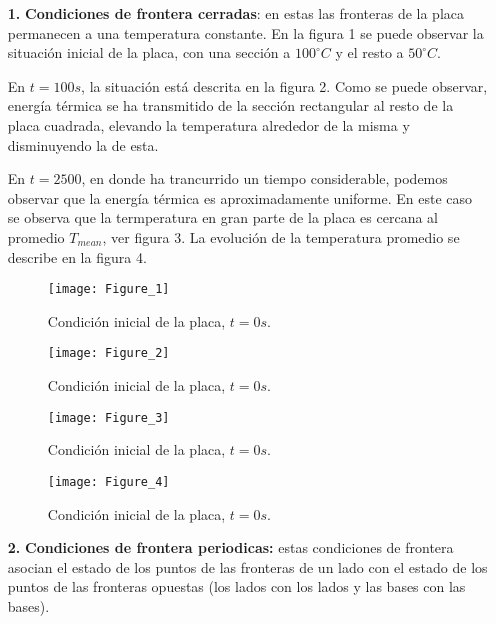 \documentclass{article}
\begin{document}
\begin{itemize}
\item[\textbf{1.}] \textbf{Condiciones de frontera cerradas}: en estas las fronteras de la placa permanecen a una temperatura constante. En la figura 1 se puede observar la situaci\'on inicial de la placa, con una secci\'on a $100^{\circ} C$ y el resto a $50^{\circ}C$.

En $t = 100 s$, la situaci\'on est\'a descrita en la figura 2. Como se puede observar,  energ\'ia t\'ermica se ha transmitido de la secci\'on rectangular al resto de la placa cuadrada, elevando la temperatura alrededor de la misma y disminuyendo la de esta.

En $t = 2500$, en donde ha trancurrido un tiempo considerable, podemos observar que la energ\'ia t\'ermica es aproximadamente uniforme. En este caso se observa que la termperatura  en gran parte de la placa es cercana al promedio $T_{mean}$, ver figura 3. La evoluci\'on  de la temperatura promedio se describe en la figura 4.

\begin{figure}
\begin{center}
\texttt{[image: Figure\_1]}
\end{center}
\caption{Condici\'on inicial de la placa, $t = 0 s$.}
\end{figure}

\begin{figure}
\begin{center}
\texttt{[image: Figure\_2]}
\end{center}
\caption{Condici\'on inicial de la placa, $t = 0 s$.}
\end{figure}

\begin{figure}
\begin{center}
\texttt{[image: Figure\_3]}
\end{center}
\caption{Condici\'on inicial de la placa, $t = 0 s$.}
\end{figure}

\begin{figure}
\begin{center}
\texttt{[image: Figure\_4]}
\end{center}
\caption{Condici\'on inicial de la placa, $t = 0 s$.}
\end{figure} 

\item[\textbf{2.}] \textbf{Condiciones de frontera periodicas:} estas condiciones de frontera asocian el estado de los puntos de las fronteras de un lado con el estado de los puntos de las fronteras opuestas (los lados con los lados y las bases con las bases).


\end{itemize}
\end{document}
